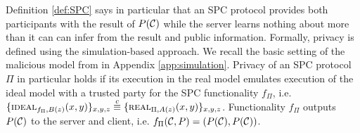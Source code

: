 \noindent
Definition \ref{def:SPC} says in particular that an SPC protocol provides both participants with the result of $P(\mathcal{C})$ while the server learns nothing about \cC more than it can can infer from the result and public information.
Formally, privacy is defined using the simulation-based approach.
We recall the basic setting of the malicious model from \cite{Goldreich2004} in Appendix \ref{app:simulation}.
Privacy of an SPC protocol $\Pi$ in particular holds if its execution in the real model emulates execution of the ideal model with a trusted party for the SPC functionality $f_\Pi$, i.e.
$ \{\IDEAL_{f_\Pi, B(z)}(x, y)\}_{x, y, z} \stackrel{c}{\equiv} \{\REAL_{\Pi, A(z)}(x, y)\}_{x, y, z}$.
Functionality $f_\Pi$ outputs $P(\mathcal{C})$ to the server and client, i.e. $f_{\Pi}(\mathcal{C}, P)=(P(\mathcal{C}), P(\mathcal{C}))$.

\setlength{\textfloatsep}{21pt}
